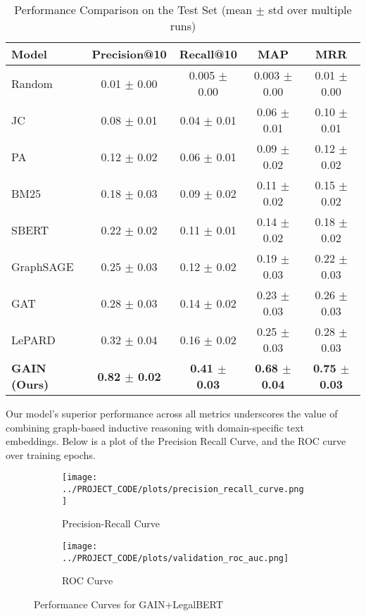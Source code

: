 \documentclass{article}
\begin{document}
\begin{table}[H]
    \centering
    \caption{Performance Comparison on the Test Set (mean $\pm$ std over multiple runs)}
    \label{tab:performance}
    \begin{tabular}{lcccc}
    \toprule
    \textbf{Model} & \textbf{Precision@10} & \textbf{Recall@10} & \textbf{MAP} & \textbf{MRR} \\
    \midrule
    Random & 0.01 $\pm$ 0.00 & 0.005 $\pm$ 0.00 & 0.003 $\pm$ 0.00 & 0.01 $\pm$ 0.00 \\
    JC & 0.08 $\pm$ 0.01 & 0.04 $\pm$ 0.01 & 0.06 $\pm$ 0.01 & 0.10 $\pm$ 0.01 \\
    PA & 0.12 $\pm$ 0.02 & 0.06 $\pm$ 0.01 & 0.09 $\pm$ 0.02 & 0.12 $\pm$ 0.02 \\
    BM25 & 0.18 $\pm$ 0.03 & 0.09 $\pm$ 0.02 & 0.11 $\pm$ 0.02 & 0.15 $\pm$ 0.02 \\
    SBERT & 0.22 $\pm$ 0.02 & 0.11 $\pm$ 0.01 & 0.14 $\pm$ 0.02 & 0.18 $\pm$ 0.02 \\
    GraphSAGE & 0.25 $\pm$ 0.03 & 0.12 $\pm$ 0.02 & 0.19 $\pm$ 0.03 & 0.22 $\pm$ 0.03 \\
    GAT & 0.28 $\pm$ 0.03 & 0.14 $\pm$ 0.02 & 0.23 $\pm$ 0.03 & 0.26 $\pm$ 0.03 \\
    LePARD & 0.32 $\pm$ 0.04 & 0.16 $\pm$ 0.02 & 0.25 $\pm$ 0.03 & 0.28 $\pm$ 0.03 \\
    \textbf{GAIN (Ours)} & \textbf{0.82 $\pm$ 0.02} & \textbf{0.41 $\pm$ 0.03} & \textbf{0.68 $\pm$ 0.04} & \textbf{0.75 $\pm$ 0.03} \\
    \bottomrule
    \end{tabular}
\end{table}

Our model’s superior performance across all metrics underscores the value of combining graph-based inductive reasoning with domain-specific text embeddings. Below is a plot of the Precision Recall Curve, and the ROC curve over training epochs.

\begin{figure}[H]
    \centering
    \begin{subfigure}{0.45\textwidth}
        \centering
        \texttt{[image: ../PROJECT\_CODE/plots/precision\_recall\_curve.png]}
        \caption{Precision-Recall Curve}
    \end{subfigure}
    \begin{subfigure}{0.45\textwidth}
        \centering
        \texttt{[image: ../PROJECT\_CODE/plots/validation\_roc\_auc.png]}
        \caption{ROC Curve}
    \end{subfigure}
    \caption{Performance Curves for GAIN+LegalBERT}
\end{figure}
\end{document}
